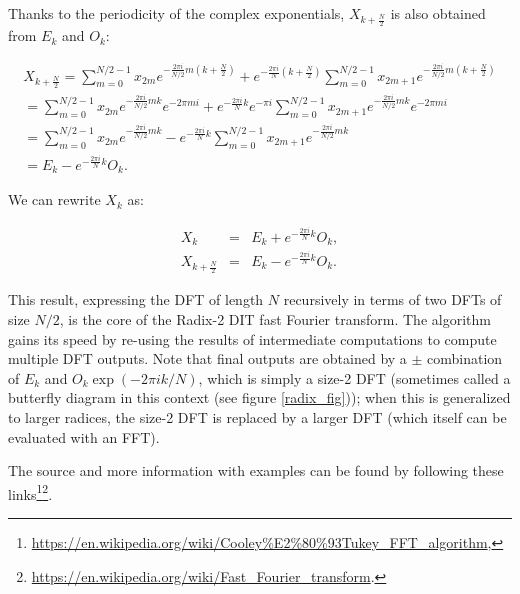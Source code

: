 \documentclass[12pt]{article}
\theoremstyle{plain}
\begin{document}
Thanks to the periodicity of the complex exponentials, $X_{k+\frac{N}{2}}$ is also obtained from $E_k$ and $O_k$:

\begin{equation}
\begin{split}
X_{k + \frac{N}{2}} =  \sum \limits_{m=0}^{N/2-1} x_{2m} e^{-\frac{2\pi i}{N/2} m(k + \frac{N}{2})} +  e^{-\frac{2\pi i}{N}(k + \frac{N}{2})} \sum \limits_{m=0}^{N/2-1} x_{2m+1} e^{-\frac{2\pi i}{N/2} m(k + \frac{N}{2} )} \\  =  \sum \limits_{m=0}^{N/2-1} x_{2m}   e^{-\frac{2\pi i}{N/2} mk} e^{-2\pi m i} +  e^{-\frac{2\pi i}{N}k}e^{-\pi i} \sum \limits_{m=0}^{N/2-1} x_{2m+1} e^{-\frac{2\pi i}{N/2} mk} e^{-2\pi m i} \\ =  \sum \limits_{m=0}^{N/2-1} x_{2m}  e^{-\frac{2\pi i}{N/2} mk} - e^{-\frac{2\pi i}{N}k} \sum \limits_{m=0}^{N/2-1} x_{2m+1} e^{-\frac{2\pi i}{N/2} mk} \\ =  E_k - e^{-\frac{2\pi i}{N}k} O_k.
\end{split}
\end{equation}

We can rewrite $X_k$ as:

\begin{equation}
\begin{matrix}
X_k & =
& E_k + e^{-\frac{2\pi i}{N}k} O_k, \\
X_{k+\frac{N}{2}} & =
& E_k - e^{-\frac{2\pi i}{N}{k}} O_k.
\end{matrix}
\end{equation}

This result, expressing the DFT of length $N$ recursively in terms of two DFTs of size $N/2$, is the core of the Radix-2 DIT fast Fourier transform. The algorithm gains its speed by re-using the results of intermediate computations to compute multiple DFT outputs.  Note that final outputs are obtained by a $\pm$ combination of $E_k$ and $O_k \exp(-2\pi i k/N)$, which is simply a size-2 DFT (sometimes called a butterfly diagram in this context (see figure \ref{radix_fig})); when this is generalized to larger radices, the size-2 DFT is replaced by a larger DFT (which itself can be evaluated with an FFT).

The source and more information with examples can be found by following these links\footnote{\url{https://en.wikipedia.org/wiki/Cooley\%E2\%80\%93Tukey_FFT_algorithm},}\footnote{\url{https://en.wikipedia.org/wiki/Fast_Fourier_transform}.}.
\end{document}

